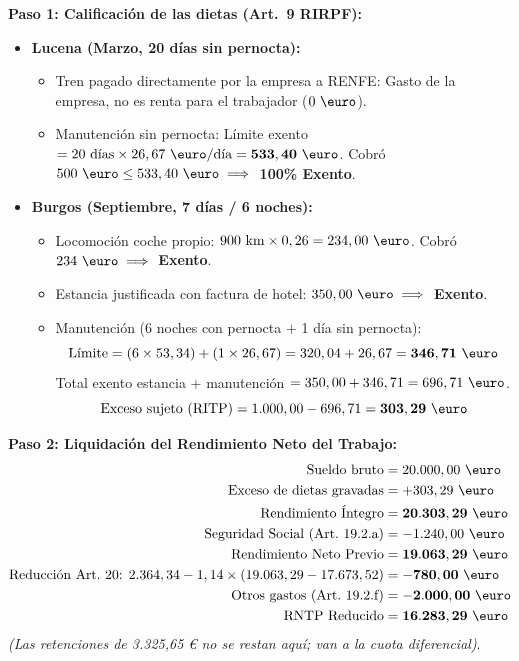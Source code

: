 \documentclass[11pt,a4paper,openany]{article}
\begin{document}
\begin{solucionBox}
\textbf{Paso 1: Calificación de las dietas (Art.~9 RIRPF):}
\begin{itemize}
    \item \textbf{Lucena (Marzo, 20 días sin pernocta):}
    \begin{itemize}
        \item Tren pagado directamente por la empresa a RENFE: Gasto de la empresa, no es renta para el trabajador ($0\text{ \euro}$).
        \item Manutención sin pernocta: Límite exento $= 20\text{ días} \times 26,67\text{ \euro/día} = \mathbf{533,40\text{ \euro}}$. Cobró $500\text{ \euro} \le 533,40\text{ \euro} \implies$ \textbf{100\% Exento}.
    \end{itemize}
    \item \textbf{Burgos (Septiembre, 7 días / 6 noches):}
    \begin{itemize}
        \item Locomoción coche propio: $900\text{ km} \times 0,26 = 234,00\text{ \euro}$. Cobró $234\text{ \euro} \implies$ \textbf{Exento}.
        \item Estancia justificada con factura de hotel: $350,00\text{ \euro} \implies$ \textbf{Exento}.
        \item Manutención (6 noches con pernocta $+$ 1 día sin pernocta):
        $$\text{Límite} = (6 \times 53,34) + (1 \times 26,67) = 320,04 + 26,67 = \mathbf{346,71\text{ \euro}}$$
        Total exento estancia $+$ manutención $= 350,00 + 346,71 = 696,71\text{ \euro}$.
        $$\text{Exceso sujeto (RITP)} = 1.000,00 - 696,71 = \mathbf{303,29\text{ \euro}}$$
    \end{itemize}
\end{itemize}

\textbf{Paso 2: Liquidación del Rendimiento Neto del Trabajo:}
\begin{align*}
    \text{Sueldo bruto} &= 20.000,00\text{ \euro} \\
    \text{Exceso de dietas gravadas} &= +303,29\text{ \euro} \\
    \mathbf{\text{Rendimiento Íntegro}} &= \mathbf{20.303,29\text{ \euro}} \\
    \text{Seguridad Social (Art.~19.2.a)} &= -1.240,00\text{ \euro} \\
    \mathbf{\text{Rendimiento Neto Previo}} &= \mathbf{19.063,29\text{ \euro}} \\
    \text{Reducción Art.~20: } 2.364,34 - 1,14 \times (19.063,29 - 17.673,52) &= -\mathbf{780,00\text{ \euro}} \\
    \text{Otros gastos (Art.~19.2.f)} &= -\mathbf{2.000,00\text{ \euro}} \\
    \mathbf{\text{RNTP Reducido}} &= \mathbf{16.283,29\text{ \euro}}
\end{align*}
\textit{\small(Las retenciones de 3.325,65 € no se restan aquí; van a la cuota diferencial)}.
\end{solucionBox}
\end{document}
